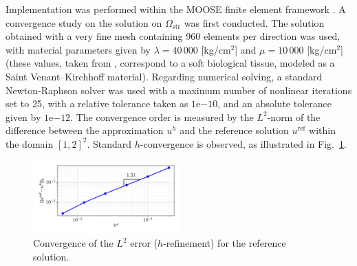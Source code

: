 Implementation was performed within the MOOSE finite element framework \cite{permann2020moose}. A convergence study on the solution on $\Omega_\text{str}$ was first conducted. The solution obtained with a very fine mesh containing 960 elements per direction was used, with material parameters given by $\lambda = 40\,000$ [kg/cm$^2$] and $\mu = 10\,000$ [kg/cm$^2$] (these values, taken from \cite{picinbono2003non}, correspond to a soft biological tissue, modeled as a Saint Venant–Kirchhoff material). Regarding numerical solving, a standard Newton-Raphson solver was used with a maximum number of nonlinear iterations set to 25, with a relative tolerance taken as $1\mathrm{e}{-10}$, and an absolute tolerance given by $1\mathrm{e}{-12}$. The convergence order is measured by the $L^2$-norm of the difference between the approximation $u^h$ and the reference solution $u^{\text{ref}}$ within the domain $[1, 2]^2$. Standard $h$-convergence is observed, as illustrated in Fig.~\ref{fig:convergence}.
\begin{figure}[!ht]
    \centering
    \includegraphics[width = 0.5\textwidth]{Pictures/convergence.png}
    \caption{Convergence of the $L^2$ error ($h$-refinement) for the reference solution.}
    \label{fig:convergence}
\end{figure}

